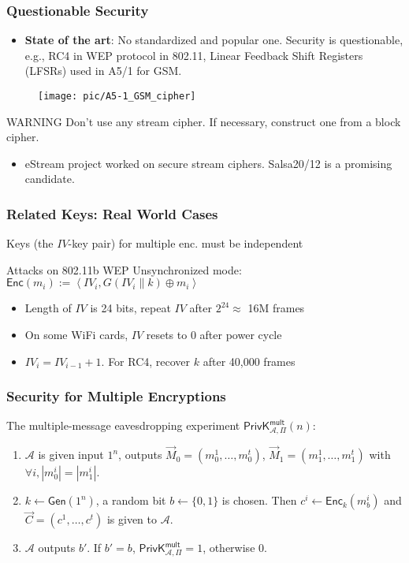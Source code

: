 \begin{frame}\frametitle{Questionable Security}
\begin{itemize}
\item \textbf{State of the art}: No standardized and popular one. Security is questionable, e.g., RC4 in WEP protocol in 802.11, Linear Feedback Shift Registers (LFSRs) used in A5/1 for GSM.
\end{itemize}
\begin{figure}
\begin{center}
\texttt{[image: pic/A5-1\_GSM\_cipher]} 
\end{center}
\end{figure}
\begin{alertblock}{WARNING}
Don't use any stream cipher. If necessary, construct one from a block cipher.
\end{alertblock}
\begin{itemize}
\item eStream project worked on secure stream ciphers. Salsa20/12 is a promising candidate.
\end{itemize}
\end{frame}
\begin{frame}\frametitle{Related Keys: Real World Cases}
Keys (the $IV$-key pair) for multiple enc. must be independent
\begin{exampleblock}{Attacks on 802.11b WEP}
Unsynchronized mode: $\mathsf{Enc}(m_i) := \left< IV_i, G(IV_i\|k) \oplus m_i\right>$\\
\begin{itemize}
\item Length of $IV$ is 24 bits, repeat $IV$ after $2^{24} \approx$ 16M frames
\item On some WiFi cards, $IV$ resets to $0$ after power cycle
\item $IV_i = IV_{i-1} + 1$. For RC4, recover $k$ after 40,000 frames
\end{itemize}
\end{exampleblock}
\end{frame}
\begin{frame}\frametitle{Security for Multiple Encryptions}
The multiple-message eavesdropping experiment $\mathsf{PrivK}^{\mathsf{mult}}_{\mathcal{A},\Pi}(n)$:
\begin{enumerate}
	\item $\mathcal{A}$ is given input $1^n$, outputs $\vec{M}_0=(m_0^1,\dots,m_0^t)$, $\vec{M}_1=(m_1^1,\dots,m_1^t)$ with $\forall i, |m_0^i| = |m_1^i|$.
	\item $k \gets \mathsf{Gen}(1^n)$, a random bit $b \gets \{0,1\}$ is chosen. Then $c^i \gets \mathsf{Enc}_k(m_b^i)$ and $\vec{C}=(c^1,\dots,c^t)$ is given to $\mathcal{A}$.
	\item $\mathcal{A}$ outputs $b'$. If $b' = b$, $\mathsf{PrivK}^{\mathsf{mult}}_{\mathcal{A},\Pi}=1$, otherwise 0.
\end{enumerate}
\begin{figure}
\begin{center}

\end{center}
\end{figure}
\end{frame}
